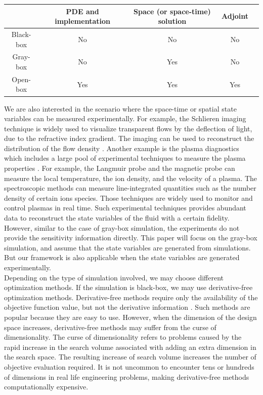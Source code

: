 \documentclass{paper1}
\begin{document}
\begin{center}
    \label{tab: boxes}
    \begin{tabular}{ccccc}
        \hline
                   & PDE and implementation & {Space (or space-time) solution} & 
                   Adjoint\\[5pt] \hline
        Black-box  & No       & No   & No  \\ \hline
        Gray-box   & No
                   & Yes    & No   \\ \hline
        Open-box   & Yes    & Yes         &   Yes      \\ \hline
    \end{tabular}
\end{center}

We are also interested in the scenario where the space-time or spatial state variables
can be measured experimentally. For example, the Schlieren imaging technique is widely used to 
visualize transparent flows by the deflection of light, due to the refractive index gradient. 
The imaging can be used to reconstruct the distribution of the flow density 
\cite{schlieren reconstruct}. Another example is the plasma diagnostics which includes a large pool of
experimental techniques to measure the plasma properties \cite{francis chen}.
For example, the Langmuir probe and the magnetic probe can measure the local temperature,
the ion density, and the velocity of a plasma. 
The spectroscopic methods can measure line-integrated quantities such as the 
number density of certain ions species. Those techniques 
are widely used to monitor and control plasmas in real time. 
Such experimental techniques provides abundant data to reconstruct the state variables of the fluid
with a certain fidelity. However, similar to the case of gray-box simulation,
the experiments do not provide the sensitivity information directly.
This paper will focus on the gray-box simulation, and assume that the state variables are generated
from simulations. But our framework is also applicable
when the state variables are generated experimentally.\\


Depending on the type of simulation involved, we may choose different optimization methods.
If the simulation is black-box, we may use derivative-free optimization methods.
Derivative-free methods require only the availability of the objective function value, but
not the derivative information \cite{gradfreereview}.
Such methods are popular because they are easy to use. However, when the dimension of the design space 
increases, derivative-free methods may suffer from the curse of dimensionality.
The curse of dimensionality refers to problems caused by the rapid increase in the search 
volume associated
with adding an extra dimension in the search space. 
The resulting increase of search volume increases the number of objective evaluation required. 
It is not uncommon to encounter tens or hundreds of dimensions in real life engineering problems,
making derivative-free methods computationally expensive.\\
\end{document}
